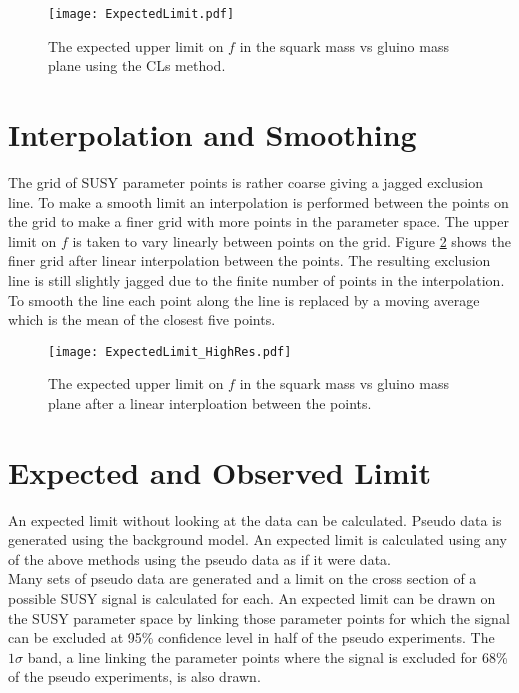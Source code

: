 \begin{figure}
\begin{center}
\texttt{[image: ExpectedLimit.pdf]}
\end{center}
\caption{The expected upper limit on $f$ in the squark mass vs gluino mass plane 
using the CLs method. }
\label{fig:limit}
\end{figure}

\section{Interpolation and Smoothing}

The grid of SUSY parameter points is rather coarse giving a jagged exclusion
line. To make a smooth limit an interpolation is performed between the points 
on the grid to make a finer grid with more points in the parameter space. The 
upper limit on $f$ is taken to vary linearly between points on the grid. Figure
\ref{fig:interpolation} shows the finer grid after linear interpolation between
the points. The resulting exclusion line is still slightly jagged due to the
finite number of points in the interpolation. To smooth the line each point
along the line is replaced by a moving average which is the mean of the closest 
five points.

\begin{figure}
\begin{center}
\texttt{[image: ExpectedLimit\_HighRes.pdf]}
\end{center}
\caption{The expected upper limit on $f$ in the squark mass vs gluino mass plane 
after a linear interploation between the points. }
\label{fig:interpolation}
\end{figure}

\section{Expected and Observed Limit}

An expected limit without looking at the data can be calculated. Pseudo data is
generated using the background model. An expected limit is calculated using any
of the above methods using the pseudo data as if it were data. \\

Many sets of pseudo data are generated and a limit on the cross section of a 
possible SUSY signal is calculated for each. An expected limit can be drawn on 
the SUSY parameter space by linking those parameter points for which the signal 
can be excluded at 95\% confidence level in half of the pseudo experiments. The 
$1 \sigma$ band, a line linking the parameter points where the signal is 
excluded for 68\% of the pseudo experiments, is also drawn. \\

